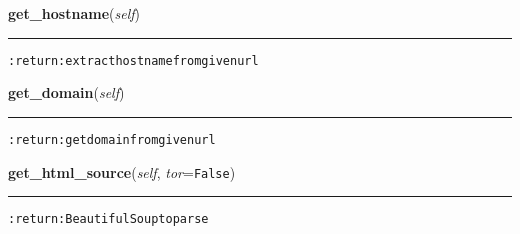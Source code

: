     \vspace{0.5ex}

\hspace{.8\funcindent}\begin{boxedminipage}{\funcwidth}

    \raggedright \textbf{get\_hostname}(\textit{self})

    \vspace{-1.5ex}

    \rule{\textwidth}{0.5\fboxrule}
\setlength{\parskip}{2ex}
\begin{alltt}

:return: extract hostname from given url
\end{alltt}

\setlength{\parskip}{1ex}
    \end{boxedminipage}

    \label{hal:internet:web:Webpage:get_domain}

    \vspace{0.5ex}

\hspace{.8\funcindent}\begin{boxedminipage}{\funcwidth}

    \raggedright \textbf{get\_domain}(\textit{self})

    \vspace{-1.5ex}

    \rule{\textwidth}{0.5\fboxrule}
\setlength{\parskip}{2ex}
\begin{alltt}

:return: get domain from given url
\end{alltt}

\setlength{\parskip}{1ex}
    \end{boxedminipage}

    \label{hal:internet:web:Webpage:get_html_source}

    \vspace{0.5ex}

\hspace{.8\funcindent}\begin{boxedminipage}{\funcwidth}

    \raggedright \textbf{get\_html\_source}(\textit{self}, \textit{tor}={\tt False})

    \vspace{-1.5ex}

    \rule{\textwidth}{0.5\fboxrule}
\setlength{\parskip}{2ex}
\begin{alltt}

:return: BeautifulSoup to parse
\end{alltt}

\setlength{\parskip}{1ex}
    \end{boxedminipage}

